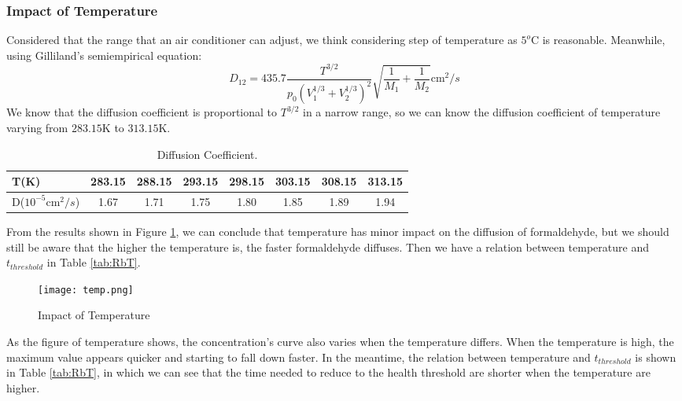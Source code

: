 \documentclass{mcmthesis}
\begin{document}
\subsubsection{Impact of Temperature}
Considered that the range that an air conditioner can adjust, we think considering step of temperature as $5^o$C is reasonable. Meanwhile, using Gilliland's semiempirical\cite{christian1959sublimation} equation:
\begin{equation}
D_{12}=435.7\frac{T^{3/2}}{p_0(V_1^{1/3}+V_2^{1/3})^2}\sqrt{\frac{1}{M_1}+\frac{1}{M_2}} \mathrm{cm}^2/s
\end{equation}
We know that the diffusion coefficient is proportional to $T^{3/2}$ in a narrow range, so we can know the diffusion coefficient of temperature varying from $283.15$K to $313.15$K.

\begin{table}[H]
  \begin{center}
    \caption{Diffusion Coefficient.}
    \label{tab:DC}
    \begin{tabular}{lccccccc}
      	\toprule
      	T(K) & 283.15 & 288.15 & 293.15 & 298.15 & 303.15 & 308.15 & 313.15\\
      	\midrule
        D($10^{-5}$cm$^2/s$) & 1.67 & 1.71 & 1.75 & 1.80 & 1.85 & 1.89 & 1.94\\
      	\bottomrule
    \end{tabular}
  \end{center}
\end{table}



From the results shown in Figure \ref{fig:temp}, we can conclude that temperature has minor impact on the diffusion of formaldehyde, but we should still be aware that the higher the temperature is, the faster formaldehyde diffuses. Then we have a relation between temperature and $t_{threshold}$ in Table \ref{tab:RbT}.

\begin{figure}[H]
  \centering
  \texttt{[image: temp.png]}
  \caption{Impact of Temperature}
  \label{fig:temp}
\end{figure}

As the figure of temperature shows, the concentration's curve also varies when the temperature differs. When the temperature is high, the maximum value appears quicker and starting to fall down faster. In the meantime, the relation between temperature and $t_{threshold}$ is shown in Table \ref{tab:RbT}, in which we can see that the time needed to reduce to the health threshold are shorter when the temperature are higher.
\end{document}
